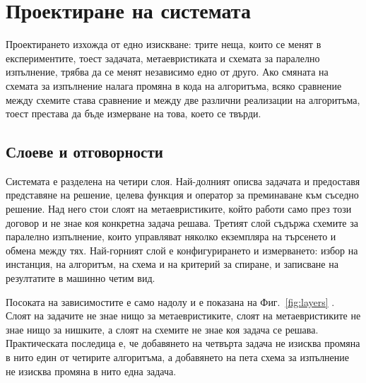\section{Проектиране на системата}
\label{sec:design}

Проектирането изхожда от едно изискване: трите неща, които се менят в
експериментите, тоест задачата, метаевристиката и схемата за паралелно изпълнение,
трябва да се менят независимо едно от друго. Ако смяната на схемата за изпълнение
налага промяна в кода на алгоритъма, всяко сравнение между схемите става сравнение и
между две различни реализации на алгоритъма, тоест престава да бъде измерване на
това, което се твърди.

\subsection{Слоеве и отговорности}
\label{subsec:design-layers}

Системата е разделена на четири слоя. Най-долният описва задачата и предоставя
представяне на решение, целева функция и оператор за преминаване към съседно решение.
Над него стои слоят на метаевристиките, който работи само през този договор и не знае
коя конкретна задача решава. Третият слой съдържа схемите за паралелно изпълнение,
които управляват няколко екземпляра на търсенето и обмена между тях. Най-горният слой
е конфигурирането и измерването: избор на инстанция, на алгоритъм, на схема и на
критерий за спиране, и записване на резултатите в машинно четим вид.

Посоката на зависимостите е само надолу и е показана на Фиг.~\ref{fig:layers}
. Слоят на задачите не знае нищо за метаевристиките, слоят на
метаевристиките не знае нищо за нишките, а слоят на схемите не знае коя задача се
решава. Практическата последица е, че добавянето на четвърта задача не изисква
промяна в нито един от четирите алгоритъма, а добавянето на пета схема за изпълнение
не изисква промяна в нито една задача.

